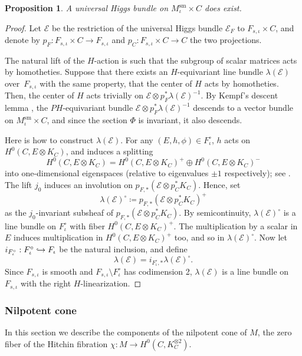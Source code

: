 \documentclass[JEP,XML,SOM,Unicode, NoEqCountersInSection,NoFloatCountersInSection,published]{cedram}
\let\mathcal\mathscr
\newcommand\hto{\mathrel{\lhook\joinrel\to}}
\newcommand{\PH}{\mathit{PH}}
\newtheorem{prop}[thm]{Proposition}
\theoremstyle{definition}
\begin{document}
\begin{prop}
A universal Higgs bundle on $M^{\mathrm{sm}}_{\iota} \times C$ does exist.
\end{prop}
\begin{proof}

Let $\mathcal{E}$ be the restriction of the universal Higgs bundle $\mathcal{E}_F$ to $F_{s, \iota} \times C$, and denote by $p_F\colon F_{s, \iota} \times C\to F_{s, \iota}$ and $p_C\colon F_{s, \iota} \times C\to C$ the two projections.

The natural lift of the $H$-action is such that the subgroup of scalar matrices acts by homotheties. Suppose that there exists an $H$-equivariant line bundle $\lambda(\mathcal{E})$ over~$F_{s,\iota}$ with the same property, \ie that the center of $H$ acts by homotheties. Then, the center of $H$ acts trivially on $\mathcal{E} \otimes p_F^*\lambda(\mathcal{E})^{-1}$. By Kempf's descent lemma \cite[Th.\,2.3]{DN89}, the $\PH$-equivariant bundle $\mathcal{E} \otimes p_F^*\lambda(\mathcal{E})^{-1}$ descends to a vector bundle on $M^{\mathrm{sm}}_{\iota} \times C$, and since the section $\Phi$ is invariant, it also descends.

Here is how to construct $\lambda(\mathcal{E})$. For any $(E, h, \phi) \in F^{\circ}_{\iota}$, $h$ acts on $H^{0}(C, E \otimes K_C)$, and induces a splitting
\[
H^{0}(C, E \otimes K_C)= H^0(C, E \otimes K_C)^{+} \oplus H^0(C, E \otimes K_C)^{-}
\]
into one-dimensional eigenspaces (relative to eigenvalues $\pm 1$ respectively); see \cite[Prop.\,4.1]{HeuLoray19}. The lift $j_0$ induces an involution on $p_{F, *}(\mathcal{E} \otimes p^*_C K_C)$. Hence, set
\[
\lambda(\mathcal{E})^{\circ}\coloneqq p_{F, *}(\mathcal{E} \otimes p^*_C K_C)^{+}
\]
as the $j_0$-invariant subsheaf of $p_{F, *}(\mathcal{E} \otimes p^*_C K_C)$.
By semicontinuity, $\lambda(\mathcal{E})^{\circ}$ is a line bundle on $F^{\circ}_{ \iota}$ with fiber $H^0(C, E \otimes K_C)^{+}$. The multiplication by a scalar in $E$ induces multiplication in $H^0(C, E \otimes K_C)^{+}$ too, and so in $\lambda(\mathcal{E})^{\circ}$. Now let $i_{F^{\circ}_{\iota}}: F^{\circ}_{\iota} \hto F_{\iota}$ be the natural inclusion, and define
\[
\lambda(\mathcal{E})= i_{F^{\circ}_{\iota}, *} \lambda(\mathcal{E})^{\circ}.
\]
Since $F_{s, \iota}$ is smooth and $F_{s, \iota} \setminus F^{\circ}_{\iota}$ has codimension 2, $\lambda(\mathcal{E})$ is a line bundle on $F_{s, \iota}$ with the right $H$-linearization.
\end{proof}

\subsubsection{Nilpotent cone}\label{sec:nilpotent}
In this section we describe the components of the nilpotent cone of $M$, \ie the zero fiber of the Hitchin fibration $\chi\colon M \to H^0(C, K_C^{\otimes 2})$.
\end{document}
